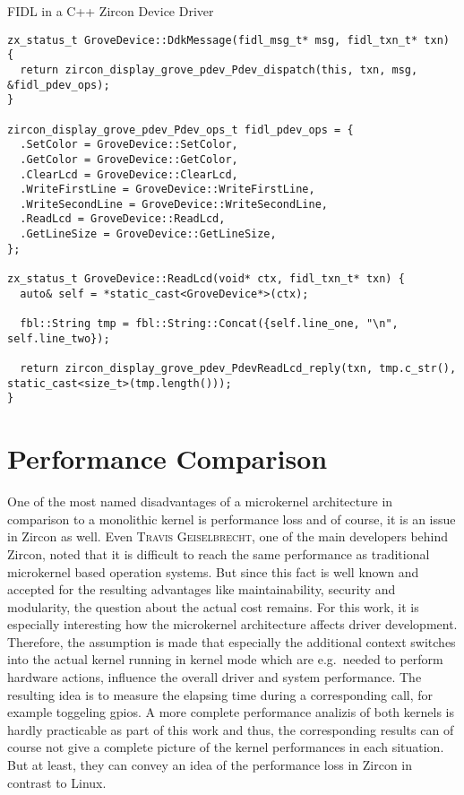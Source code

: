 \begin{listing} [H]
\caption{FIDL in a C++ Zircon Device Driver}
\label{lst:cppmessage}
\begin{verbatim}
zx_status_t GroveDevice::DdkMessage(fidl_msg_t* msg, fidl_txn_t* txn) {
  return zircon_display_grove_pdev_Pdev_dispatch(this, txn, msg, &fidl_pdev_ops);
}

zircon_display_grove_pdev_Pdev_ops_t fidl_pdev_ops = {
  .SetColor = GroveDevice::SetColor,
  .GetColor = GroveDevice::GetColor,
  .ClearLcd = GroveDevice::ClearLcd,
  .WriteFirstLine = GroveDevice::WriteFirstLine,
  .WriteSecondLine = GroveDevice::WriteSecondLine,
  .ReadLcd = GroveDevice::ReadLcd,
  .GetLineSize = GroveDevice::GetLineSize,
};

zx_status_t GroveDevice::ReadLcd(void* ctx, fidl_txn_t* txn) {
  auto& self = *static_cast<GroveDevice*>(ctx);

  fbl::String tmp = fbl::String::Concat({self.line_one, "\n", self.line_two});

  return zircon_display_grove_pdev_PdevReadLcd_reply(txn, tmp.c_str(), static_cast<size_t>(tmp.length()));
}
\end{verbatim}
\end{listing}


 
\section{Performance Comparison}
One of the most named disadvantages of a microkernel architecture in comparison to a monolithic kernel is performance loss and of course, it is an issue in Zircon as well.
Even \textsc{Travis Geiselbrecht}, one of the main developers behind Zircon, noted that it is difficult to reach the same performance as traditional microkernel based operation systems\cite{chat-zircon-arch}.
But since this fact is well known and accepted for the resulting advantages like maintainability, security and modularity, the question about the actual cost remains.
For this work, it is especially interesting how the microkernel architecture affects driver development.
Therefore, the assumption is made that especially the additional context switches into the actual kernel running in kernel mode which are e.g.\ needed to perform hardware actions, influence the overall driver and system performance.
The resulting idea is to measure the elapsing time during a corresponding call, for example toggeling \acp{gpio}.
A more complete performance analizis of both kernels is hardly practicable as part of this work and thus, the corresponding results can of course not give a complete picture of the kernel performances in each situation.
But at least, they can convey an idea of the performance loss in Zircon in contrast to Linux.

